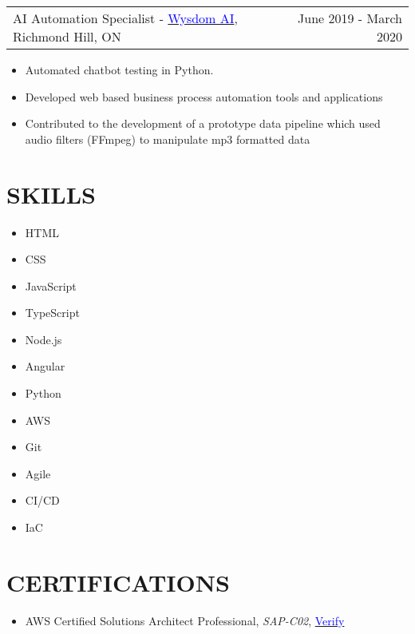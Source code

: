 \documentclass[margin]{res}
\begin{document}
\begin{resume}
	\begin{tabular}{p{3in} r} %
		AI Automation Specialist - \href{https://wysdom.ai}{\textcolor{blue}{Wysdom AI}}, Richmond Hill, ON & June 2019 - March 2020
	\end{tabular}
	\begin{itemize} %
		\item Automated chatbot testing in Python.
		\item Developed web based business process automation tools and applications
		\item Contributed to the development of a prototype data pipeline which used audio filters
		      (FFmpeg) to manipulate mp3 formatted data

	\end{itemize}
	\section{\textcolor{NavyBlue}{SKILLS}}
	\begin{multicols}{3}
		\begin{itemize}
			\item HTML
			\item CSS
			\item JavaScript
			\item TypeScript
			\item Node.js
			\item Angular
			\item Python
			\item AWS
			\item Git
			\item Agile
			\item CI/CD
			\item IaC
		\end{itemize}
	\end{multicols}

	\section{\textcolor{NavyBlue}{CERTIFICATIONS}}
	\begin{itemize} %
		\item AWS Certified Solutions Architect Professional, \textit{SAP-C02},
		      \href{https://www.youracclaim.com/badges/6768bef0-a7c0-42a6-9b36-6e13351250be}{\textcolor{blue}{Verify}}


\end{itemize}
\end{resume}
\end{document}
